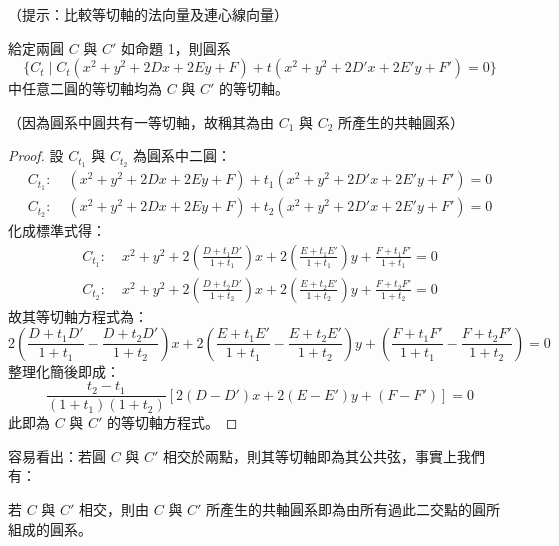 （提示：比較等切軸的法向量及連心線向量）

\begin{prop}
給定兩圓 $C$ 與 $C'$ 如命題 1，則圓系
\[
\{C_t \mid C_t(x^2+y^2+2Dx+2Ey+F) + t(x^2+y^2+2D'x+2E'y+F') = 0\}
\]
中任意二圓的等切軸均為 $C$ 與 $C'$ 的等切軸。

（因為圓系中圓共有一等切軸，故稱其為由 $C_1$ 與 $C_2$ 所產生的共軸圓系）
\end{prop}

\begin{proof}
設 $C_{t_1}$ 與 $C_{t_2}$ 為圓系中二圓：
\begin{align*}
C_{t_1}:&\; (x^2+y^2+2Dx+2Ey+F) + t_1(x^2+y^2+2D'x+2E'y+F') = 0 \\
C_{t_2}:&\; (x^2+y^2+2Dx+2Ey+F) + t_2(x^2+y^2+2D'x+2E'y+F') = 0
\end{align*}
化成標準式得：
\begin{align*}
C_{t_1}:&\; x^2+y^2+2\left(\frac{D+t_1 D'}{1+t_1}\right)x + 2\left(\frac{E+t_1 E'}{1+t_1}\right)y + \frac{F+t_1 F'}{1+t_1} = 0 \\
C_{t_2}:&\; x^2+y^2+2\left(\frac{D+t_2 D'}{1+t_2}\right)x + 2\left(\frac{E+t_2 E'}{1+t_2}\right)y + \frac{F+t_2 F'}{1+t_2} = 0
\end{align*}
故其等切軸方程式為：
\[
2\left(\frac{D+t_1 D'}{1+t_1} - \frac{D+t_2 D'}{1+t_2}\right)x + 2\left(\frac{E+t_1 E'}{1+t_1} - \frac{E+t_2 E'}{1+t_2}\right)y + \left(\frac{F+t_1 F'}{1+t_1} - \frac{F+t_2 F'}{1+t_2}\right) = 0
\]
整理化簡後即成：
\[
\frac{t_2-t_1}{(1+t_1)(1+t_2)} [2(D-D')x + 2(E-E')y + (F-F')] = 0
\]
此即為 $C$ 與 $C'$ 的等切軸方程式。
\end{proof}

容易看出：若圓 $C$ 與 $C'$ 相交於兩點，則其等切軸即為其公共弦，事實上我們有：

\begin{prop}
若 $C$ 與 $C'$ 相交，則由 $C$ 與 $C'$ 所產生的共軸圓系即為由所有過此二交點的圓所組成的圓系。
\end{prop}

